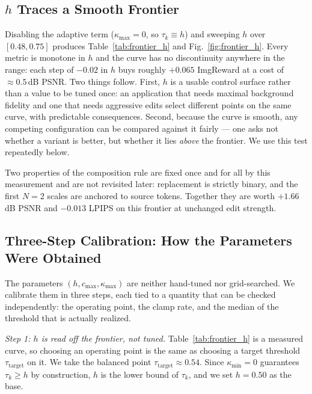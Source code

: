 

\subsection{$h$ Traces a Smooth Frontier}
\label{sec:frontier}




Disabling the adaptive term ($\kappa_{\max}{=}0$, so $\tau_k \equiv h$) and
sweeping $h$ over $[0.48, 0.75]$ produces Table~\ref{tab:frontier_h} and
Fig.~\ref{fig:frontier_h}. Every
metric is monotone in $h$ and the curve has no discontinuity anywhere in the
range: each step of $-0.02$ in $h$ buys roughly $+0.065$ ImgReward at a cost of
$\approx\!0.5$\,dB PSNR. Two things follow. First, $h$ is a usable control
surface rather than a value to be tuned once: an application that needs maximal
background fidelity and one that needs aggressive edits select different points
on the same curve, with predictable consequences. Second, because the curve is
smooth, any competing configuration can be compared against it fairly --- one
asks not whether a variant is better, but whether it lies \emph{above} the
frontier. We use this test repeatedly below.

Two properties of the composition rule are fixed once and for all by this
measurement and are not revisited later: replacement is strictly binary, and the
first $N{=}2$ scales are anchored to source tokens. Together they are worth
$+1.66$\,dB PSNR and $-0.013$ LPIPS on this frontier at unchanged edit
strength.

\subsection{Three-Step Calibration: How the Parameters Were Obtained}
\label{sec:calibration}



The parameters $(h, c_{\max}, \kappa_{\max})$ are neither hand-tuned nor
grid-searched. We calibrate them in three steps, each tied to a quantity that can
be checked independently: the operating point, the clamp rate, and the median of
the threshold that is actually realized.

\noindent\textit{Step 1: $h$ is read off the frontier, not tuned.}
Table~\ref{tab:frontier_h} is a measured curve, so choosing an operating point is
the same as choosing a target threshold $\tau_{\mathrm{target}}$ on it. We take
the balanced point $\tau_{\mathrm{target}} \approx 0.54$. Since
$\kappa_{\min} = 0$ guarantees $\tau_k \ge h$ by construction, $h$ is the lower
bound of $\tau_k$, and we set $h = 0.50$ as the base.

